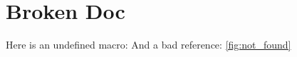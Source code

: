 \documentclass{article}
\begin{document}
\section{Broken Doc}
Here is an undefined macro: \nonexistentcommand
And a bad reference: \ref{fig:not_found}
\end{document}
